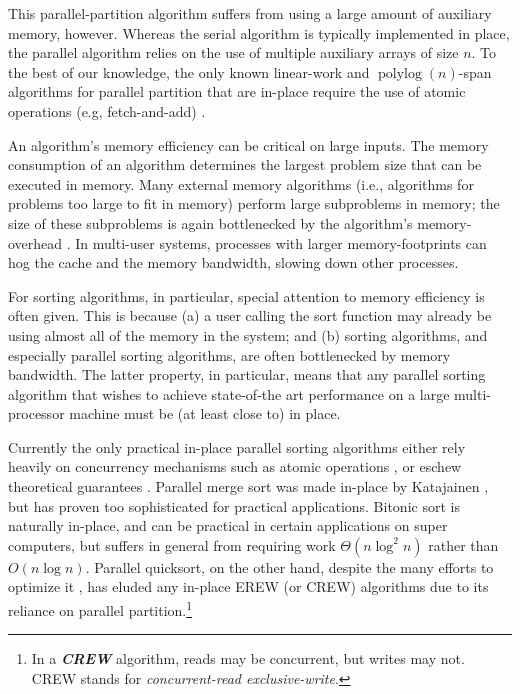 \documentclass[11pt]{article}
\newcommand{\defn}[1]{{\textit{\textbf{\boldmath #1}}}}
\theoremstyle{remark}
\theoremstyle{remark}
\begin{document}
This parallel-partition algorithm suffers from using a large amount of
auxiliary memory, however. Whereas the serial algorithm is typically
implemented in place, the parallel algorithm relies on the use of multiple
auxiliary arrays of size $n$. To the best of our knowledge, the only
known linear-work and $\operatorname{polylog}(n)$-span algorithms for
parallel partition that are in-place require the use of atomic
operations (e.g, fetch-and-add)
\cite{HeidelbergerNo90,AxtmannWi17,TsigasZh03}.

An algorithm's memory efficiency can be critical on large inputs. The
memory consumption of an algorithm determines the largest problem size
that can be executed in memory. Many external memory algorithms (i.e.,
algorithms for problems too large to fit in memory) perform large
subproblems in memory; the size of these subproblems is again
bottlenecked by the algorithm's memory-overhead \cite{Vitter08}. In
multi-user systems, processes with larger memory-footprints can hog
the cache and the memory bandwidth, slowing down other processes.

For sorting algorithms, in particular, special attention to memory
efficiency is often given. This is because (a) a user calling the sort
function may already be using almost all of the memory in the system;
and (b) sorting algorithms, and especially parallel sorting
algorithms, are often bottlenecked by memory bandwidth. The latter
property, in particular, means that any parallel sorting algorithm
that wishes to achieve state-of-the art performance on a large
multi-processor machine must be (at least close to) in place.

Currently the only practical in-place parallel sorting algorithms
either rely heavily on concurrency mechanisms such as atomic operations
\cite{HeidelbergerNo90, AxtmannWi17, TsigasZh03}, or eschew
theoretical guarantees \cite{FrancisPa92}. Parallel merge sort
\cite{Hagerup89} was made in-place by Katajainen \cite{Katajainen93},
but has proven too sophisticated for practical applications. Bitonic
sort \cite{BlellochLe98} is naturally in-place, and can be practical
in certain applications on super computers, but suffers in general
from requiring work $\Theta(n \log^2 n)$ rather than $O(n \log
n)$. Parallel quicksort, on the other hand, despite the many efforts
to optimize it \cite{HeidelbergerNo90, AxtmannWi17, TsigasZh03,
  FrancisPa92, Frias08}, has eluded any in-place EREW (or CREW)
algorithms due to its reliance on parallel partition.\footnote{In a \defn{CREW}
algorithm, reads may be concurrent, but writes may not. CREW stands for
\emph{concurrent-read exclusive-write}.}
\end{document}
